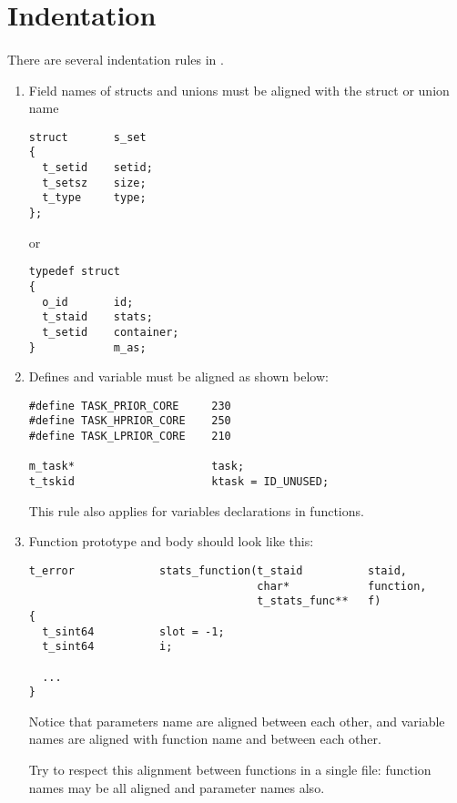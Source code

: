 \section*{Indentation}

\paragraph{}
There are several indentation rules in \kaneton.

\begin{enumerate}

\item  Field names  of structs  and unions  must be  aligned  with the
struct or union name

\begin{verbatim}
struct       s_set
{
  t_setid    setid;
  t_setsz    size;
  t_type     type;
};
\end{verbatim}

or

\begin{verbatim}
typedef struct
{
  o_id       id;
  t_staid    stats;
  t_setid    container;
}            m_as;
\end{verbatim}

\item Defines and variable must be aligned as shown below:

\begin{verbatim}
#define TASK_PRIOR_CORE     230
#define TASK_HPRIOR_CORE    250
#define TASK_LPRIOR_CORE    210

m_task*                     task;
t_tskid                     ktask = ID_UNUSED;
\end{verbatim}

This rule also applies for variables declarations in functions.

\item Function prototype and body should look like this:

\begin{verbatim}
t_error             stats_function(t_staid          staid,
                                   char*            function,
                                   t_stats_func**   f)
{
  t_sint64          slot = -1;
  t_sint64          i;

  ...
}
\end{verbatim}

Notice  that  parameters name  are  aligned  between  each other,  and
variable names are aligned with function name and between each other.

Try  to respect  this alignment  between functions  in a  single file:
function names may be all aligned and parameter names also.

\end{enumerate}

